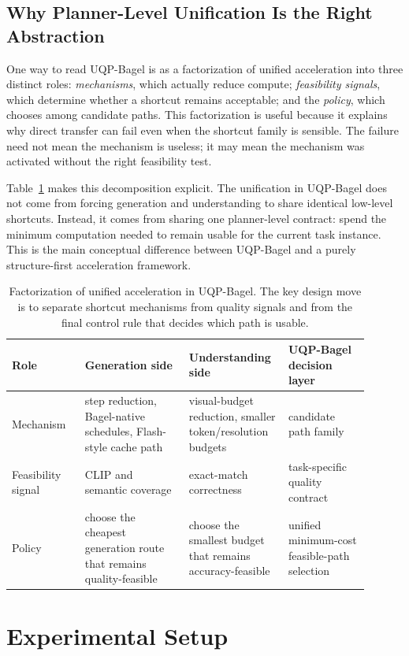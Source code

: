 \documentclass{article}
\begin{document}
\subsection{Why Planner-Level Unification Is the Right Abstraction}
One way to read UQP-Bagel is as a factorization of unified acceleration into three distinct roles: \emph{mechanisms}, which actually reduce compute; \emph{feasibility signals}, which determine whether a shortcut remains acceptable; and the \emph{policy}, which chooses among candidate paths. This factorization is useful because it explains why direct transfer can fail even when the shortcut family is sensible. The failure need not mean the mechanism is useless; it may mean the mechanism was activated without the right feasibility test.

Table~\ref{tab:factorization} makes this decomposition explicit. The unification in UQP-Bagel does not come from forcing generation and understanding to share identical low-level shortcuts. Instead, it comes from sharing one planner-level contract: spend the minimum computation needed to remain usable for the current task instance. This is the main conceptual difference between UQP-Bagel and a purely structure-first acceleration framework.

\begin{table}[t]
\caption{Factorization of unified acceleration in UQP-Bagel. The key design move is to separate shortcut mechanisms from quality signals and from the final control rule that decides which path is usable.}
\label{tab:factorization}
\centering
\small
\begin{tabular}{p{0.19\linewidth}p{0.27\linewidth}p{0.23\linewidth}p{0.21\linewidth}}
\toprule
Role & Generation side & Understanding side & UQP-Bagel decision layer \\
\midrule
Mechanism & step reduction, Bagel-native schedules, Flash-style cache path & visual-budget reduction, smaller token/resolution budgets & candidate path family \\
Feasibility signal & CLIP and semantic coverage & exact-match correctness & task-specific quality contract \\
Policy & choose the cheapest generation route that remains quality-feasible & choose the smallest budget that remains accuracy-feasible & unified minimum-cost feasible-path selection \\
\bottomrule
\end{tabular}
\end{table}

\section{Experimental Setup}
\end{document}
